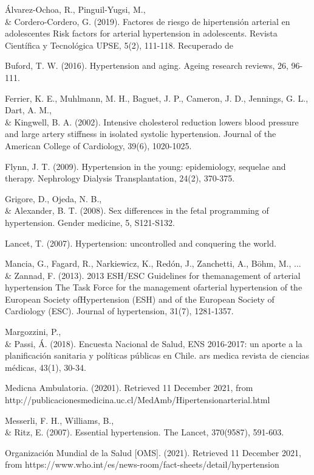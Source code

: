 \documentclass{aa}
\begin{document}
\tiny
\begin{hangparas}{.25in}{1}

Álvarez-Ochoa, R., Pinguil-Yugsi, M., \\\& Cordero-Cordero, G. (2019). Factores de riesgo de hipertensión arterial en adolescentes Risk factors for arterial hypertension in adolescents. Revista Científica y Tecnológica UPSE, 5(2), 111-118. Recuperado de

Buford, T. W. (2016). Hypertension and aging. Ageing research reviews, 26, 96-111.

Ferrier, K. E., Muhlmann, M. H., Baguet, J. P., Cameron, J. D., Jennings, G. L., Dart, A. M., \\\& Kingwell, B. A. (2002). Intensive cholesterol reduction lowers blood pressure and large artery stiffness in isolated systolic hypertension. Journal of the American College of Cardiology, 39(6), 1020-1025.

Flynn, J. T. (2009). Hypertension in the young: epidemiology, sequelae and therapy. Nephrology Dialysis Transplantation, 24(2), 370-375.

Grigore, D., Ojeda, N. B., \\\& Alexander, B. T. (2008). Sex differences in the fetal programming of hypertension. Gender medicine, 5, S121-S132.

Lancet, T. (2007). Hypertension: uncontrolled and conquering the world.

Mancia, G., Fagard, R., Narkiewicz, K., Redón, J., Zanchetti, A., Böhm, M., ... \\\& Zannad, F. (2013). 2013 ESH/ESC Guidelines for themanagement of arterial hypertension The Task Force for the management ofarterial hypertension of the European Society ofHypertension (ESH) and of the European Society of Cardiology (ESC). Journal of hypertension, 31(7), 1281-1357.

Margozzini, P., \\\& Passi, Á. (2018). Encuesta Nacional de Salud, ENS 2016-2017: un aporte a la planificación sanitaria y políticas públicas en Chile. ars medica revista de ciencias médicas, 43(1), 30-34.

Medicna Ambulatoria. (20201). Retrieved 11 December 2021, from http://publicacionesmedicina.uc.cl/MedAmb/Hipertensionarterial.html %

Messerli, F. H., Williams, B., \\\& Ritz, E. (2007). Essential hypertension. The Lancet, 370(9587), 591-603.

Organización Mundial de la Salud [OMS]. (2021). Retrieved 11 December 2021, from https://www.who.int/es/news-room/fact-sheets/detail/hypertension


\end{hangparas}
\end{document}

